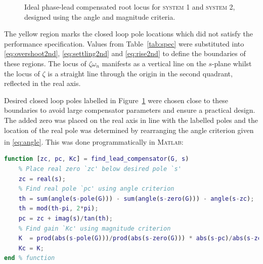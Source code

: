 \documentclass[a4paper,10pt,twocolumn]{article}
\newcommand{\Matlab}{\textsc{Matlab}\textsuperscript{\textregistered}\xspace}
\begin{document}
\begin{figure}[h!]
	\caption{Ideal phase-lead compensated root locus for \textcolor{red!}{\textsc{system} 1} and \textcolor{blue!}{\textsc{system} 2}, designed using the angle and magnitude criteria.}
	\label{fig:derive_lead}
\end{figure}

The yellow region marks the closed loop pole locations which did not satisfy the performance specification. Values from Table~\ref{tab:spec} were substituted into \eqref{eq:overshoot2nd}, \eqref{eq:settling2nd} and \eqref{eq:rise2nd} to define the boundaries of these regions. The locus of $\zeta\omega_n$ manifests as a vertical line on the $s$-plane whilst the locus of $\zeta$ is a straight line through the origin in the second quadrant, reflected in the real axis.

Desired closed loop poles labelled in Figure~\ref{fig:derive_lead} were chosen close to these boundaries to avoid large compensator parameters and ensure a practical design. The added zero was placed on the real axis in line with the labelled poles and the location of the real pole was determined by rearranging the angle criterion given in \eqref{eq:angle}. This was done programmatically in \Matlab:
\begin{lstlisting}[language=Matlab,style=mystyle,morekeywords={mod,pole,zero,dcgain}]
function [zc, pc, Kc] = find_lead_compensator(G, s)
	% Place real zero `zc' below desired pole `s'
	zc = real(s);
	% Find real pole `pc' using angle criterion
	th = sum(angle(s-pole(G))) - sum(angle(s-zero(G))) - angle(s-zc);
	th = mod(th-pi, 2*pi);
	pc = zc + imag(s)/tan(th);
	% Find gain `Kc' using magnitude criterion
	K  = prod(abs(s-pole(G)))/prod(abs(s-zero(G))) * abs(s-pc)/abs(s-zc);
	Kc = K;
end % function
\end{lstlisting}
\end{document}
